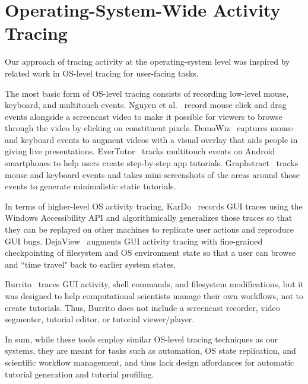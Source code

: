 \section{Operating-System-Wide Activity Tracing}

Our approach of tracing activity at the operating-system level was 
inspired by related work in OS-level tracing for user-facing tasks.

The most basic form of OS-level tracing consists of recording low-level
mouse, keyboard, and multitouch events. Nguyen et al.~\cite{Nguyen2015}
record mouse click and drag events alongside a screencast video to make
it possible for viewers to browse through the video by clicking on
constituent pixels. DemoWiz~\cite{Chi2014} captures mouse and keyboard
events to augment videos with a visual overlay that aids people in
giving live presentations. EverTutor~\cite{Wang2014} tracks multitouch
events on Android smartphones to help users create step-by-step app
tutorials. Graphstract~\cite{Huang2007} tracks mouse and keyboard events
and takes mini-screenshots of the areas around those events to generate
minimalistic static tutorials. 

In terms of higher-level OS activity tracing, KarDo~\cite{Kushman2010}
records GUI traces using the Windows Accessibility API and
algorithmically generalizes those traces so that they can be replayed on
other machines to replicate user actions and reproduce GUI bugs.
DejaView~\cite{Laadan2007} augments GUI activity tracing with
fine-grained checkpointing of filesystem and OS environment state so
that a user can browse and ``time travel" back to earlier system states.

Burrito~\cite{GuoBurrito2012} traces GUI activity, shell commands, and filesystem modifications, but it was designed to help computational scientists
manage their own workflows, not to create tutorials. Thus, Burrito does not include a
screencast recorder, video segmenter, tutorial editor, or
tutorial viewer/player.

In sum, while these tools employ similar OS-level tracing techniques as
our systems, they are meant for tasks such as automation, OS state
replication, and scientific workflow management, and thus lack design affordances for automatic tutorial generation and tutorial profiling. 
